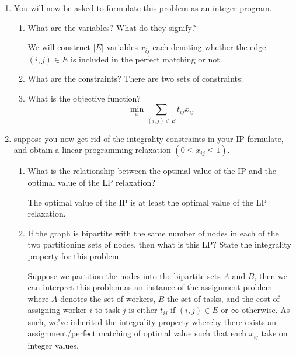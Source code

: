 \documentclass[12pt,a4paper,svgnames]{article}
\begin{document}
\begin{enumerate}[label=\textbf{Exercise \arabic*\ }]
\begin{enumerate}
\item You will now be asked to formulate this problem as an integer program.
\begin{enumerate}
\item What are the variables? What do they signify?

\vspace{4mm}
We will construct $|E|$ variables $x_{ij}$ each denoting whether the edge $(i,j) \in E$ is included in the perfect matching or not.
\item What are the constraints?
There are two sets of constraints:
\item What is the objective function?
$$
\min_{x} \sum_{(i,j)\in E}t_{ij}x_{ij}
$$
\end{enumerate}

\item suppose you now get rid of the integrality constraints in your IP formulate, and obtain a linear programming relaxation $(0 \le x_{ij} \le 1)$.
\begin{enumerate}
\item What is the relationship between the optimal value of the IP and the optimal value of the LP relaxation?

\vspace{4mm}
The optimal value of the IP is at least the optimal value of the LP relaxation.

\item If the graph is bipartite with the same number of nodes in each of the two partitioning sets of nodes, then what is this LP? State the integrality property for this problem.

\vspace{4mm}
Suppose we partition the nodes into the bipartite sets $A$ and $B$, then we can interpret this problem as an instance of the assignment problem where $A$ denotes the set of workers, $B$ the set of tasks, and the cost of assigning worker $i$ to task $j$ is either $t_{ij}$ if $(i,j) \in E$ or $\infty$ otherwise. As such, we've inherited the integrality property whereby there exists an assignment/perfect matching of optimal value such that each $x_{ij}$ take on integer values.


\end{enumerate}
\end{enumerate}
\end{enumerate}
\end{document}
